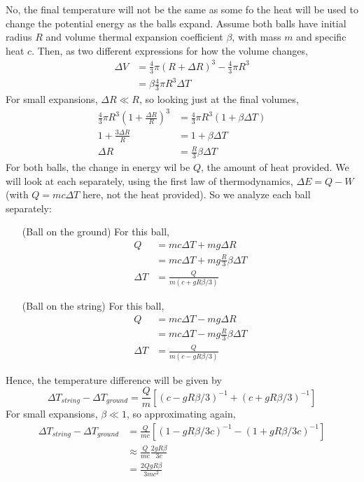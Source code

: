 \documentclass{article}
\begin{document}
No, the final temperature will not be the same as some fo the heat will be used to change the potential energy as the balls expand. Assume both balls have initial radius $R$ and volume thermal expansion coefficient $\beta$, with mass $m$ and specific heat $c$. Then, as two different expressions for how the volume changes,
\begin{align*}
\Delta V &= \frac{4}{3}\pi (R + \Delta R)^3 - \frac{4}{3}\pi R^3 \\
&= \beta \frac{4}{3} \pi R^3 \Delta T
\end{align*}
For small expansions, $\Delta R \ll R$, so looking just at the final volumes,
\begin{align*}
\frac{4}{3}\pi R^3\left(1+\frac{\Delta R}{R}\right)^3 &= \frac{4}{3}\pi R^3(1+\beta \Delta T) \\
1+\frac{3\Delta R}{R} &= 1 + \beta \Delta T \\
\Delta R &= \frac{R}{3}\beta \Delta T
\end{align*}
For both balls, the change in energy wil be $Q$, the amount of heat provided. We will look at each separately, using the first law of thermodynamics, $\Delta E = Q - W$ (with $Q = mc\Delta T$ here, not the heat provided). So we analyze each ball separately:
\begin{itemize}
	\item[(Ball on the ground)] For this ball,
	\begin{align*}
	Q &= mc\Delta T + mg\Delta R \\
	&= mc\Delta T + mg\frac{R}{3}\beta\Delta T \\
	\Delta T &= \frac{Q}{m(c+gR\beta /3)}
	\end{align*}
	\item[(Ball on the string)] For this ball,
	\begin{align*}
	Q &= mc\Delta T - mg\Delta R \\
	&= mc\Delta T - mg\frac{R}{3}\beta\Delta T \\
	\Delta T &= \frac{Q}{m(c-gR\beta /3)}
	\end{align*}
\end{itemize}
Hence, the temperature difference will be given by
\begin{equation}
\Delta T_{string} - \Delta T_{ground} = \frac{Q}{m}\left[(c-gR\beta /3)^{-1} + (c + gR\beta /3)^{-1}\right]
\end{equation}
For small expansions, $\beta\ll 1$, so approximating again,
\begin{align*}
\Delta T_{string} - \Delta T_{ground} &= \frac{Q}{mc}\left[(1-gR\beta /3c)^{-1} - (1+gR\beta /3c)^{-1}\right] \\
&\approx \frac{Q}{mc}\frac{2gR\beta}{3c} \\
&= \frac{2QgR\beta}{3mc^2}
\end{align*}
\end{document}
